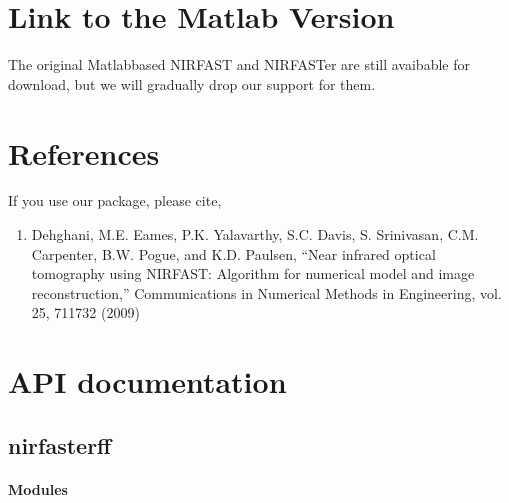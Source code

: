 \documentclass[letterpaper,10pt,english]{sphinxmanual}
\begin{document}
\chapter{Link to the Matlab Version}
\label{\detokenize{index:link-to-the-matlab-version}}
\sphinxAtStartPar
The original Matlab\sphinxhyphen{}based NIRFAST and NIRFASTer are still avaibable for download, but we will gradually drop our support for them.

\sphinxAtStartPar
{}

\sphinxAtStartPar
{}


\chapter{References}
\label{\detokenize{index:references}}
\sphinxAtStartPar
If you use our package, please cite,
\begin{enumerate}
%
\setcounter{enumi}{7}
\item {} 
\sphinxAtStartPar
Dehghani, M.E. Eames, P.K. Yalavarthy, S.C. Davis, S. Srinivasan, C.M. Carpenter, B.W. Pogue, and K.D. Paulsen, “Near infrared optical tomography using NIRFAST: Algorithm for numerical model and image reconstruction,” Communications in Numerical Methods in Engineering, vol. 25, 711\sphinxhyphen{}732 (2009) 

\end{enumerate}


\chapter{API documentation}
\label{\detokenize{index:api-documentation}}
\sphinxstepscope


\section{nirfasterff}
\label{\detokenize{_autosummary/nirfasterff:module-nirfasterff}}\label{\detokenize{_autosummary/nirfasterff:nirfasterff}}\label{\detokenize{_autosummary/nirfasterff::doc}}\subsubsection*{Modules}
\end{document}
